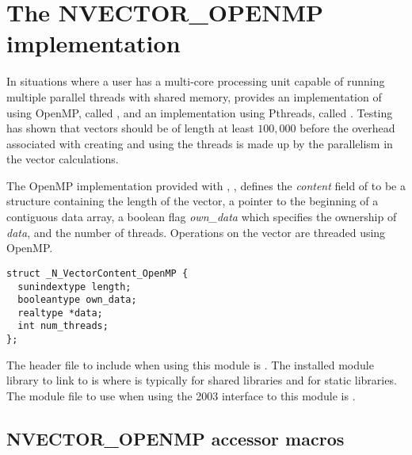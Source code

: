 \section{The NVECTOR\_OPENMP implementation}\label{ss:nvec_openmp}

In situations where a user has a multi-core processing unit capable of
running multiple parallel threads with shared memory, {\sundials} provides
an implementation of {\nvector} using OpenMP, called {\nvecopenmp}, and
an implementation using Pthreads, called {\nvecpthreads}.  
Testing has shown that vectors should be of length at least $100,000$ 
before the overhead associated with creating and using the threads is
made up by the parallelism in the vector calculations. 

The OpenMP {\nvector} implementation provided with {\sundials},
{\nvecopenmp}, defines the {\em content} field of  to be a structure 
containing the length of the vector, a pointer to the beginning of a contiguous 
data array, a boolean flag {\em own\_data} which specifies the ownership 
of {\em data}, and the number of threads.  
Operations on the vector are threaded using OpenMP.
\begin{verbatim} 
struct _N_VectorContent_OpenMP {
  sunindextype length;
  booleantype own_data;
  realtype *data;
  int num_threads;
};
\end{verbatim}

The header file to include when using this module is .
The installed module library to link to is
where  is typically  for shared libraries and 
for static libraries.
The {\F} module file to use when using the {\F} 2003 interface to
this module is .


\subsection{NVECTOR\_OPENMP accessor macros}
\label{ss:nvec_openmp_macros}

